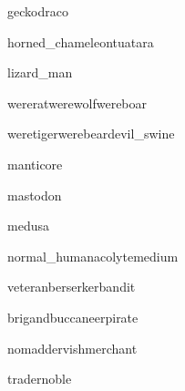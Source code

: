 \documentclass[a4paper,serif]{module}
\begin{document}
\begin{newmonster2}{gecko}{draco}\end{newmonster2}
\begin{newmonster2*}{horned_chameleon}{tuatara}{}{}\end{newmonster2*}

\begin{newmonster}{lizard_man}\end{newmonster}


\begin{newmonster3}{wererat}{werewolf}{wereboar}\end{newmonster3}
\begin{newmonster3*}{weretiger}{werebear}{devil_swine}{}{}\end{newmonster3*}

\begin{newmonster}{manticore}\end{newmonster}

\begin{newmonster}{mastodon}\end{newmonster}

\begin{newmonster}{medusa}\end{newmonster}


\begin{newmonster3}{normal_human}{acolyte}{medium}\end{newmonster3}
\begin{newmonster3*}{veteran}{berserker}{bandit}{}{}\end{newmonster3*}
\begin{newmonster3*}{brigand}{buccaneer}{pirate}{}{}\end{newmonster3*}
\begin{newmonster3*}{nomad}{dervish}{merchant}{}{}\end{newmonster3*}
\begin{newmonster2*}{trader}{noble}{}{}\end{newmonster2*}
\end{document}
